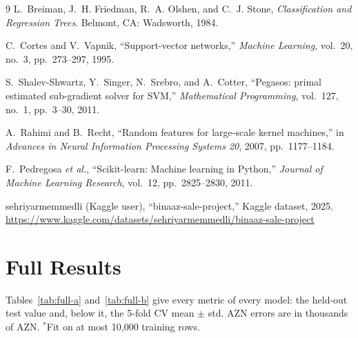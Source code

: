 \documentclass[10pt,twocolumn,a4paper]{article}
\renewcommand{\thesection}{\Roman{section}}
\begin{document}
\begin{thebibliography}{9}
L.~Breiman, J.~H. Friedman, R.~A. Olshen, and C.~J. Stone,
\emph{Classification and Regression Trees}. Belmont, CA: Wadsworth, 1984.

C.~Cortes and V.~Vapnik, ``Support-vector networks,''
\emph{Machine Learning}, vol.~20, no.~3, pp.~273--297, 1995.

S.~Shalev-Shwartz, Y.~Singer, N.~Srebro, and A.~Cotter,
``Pegasos: primal estimated sub-gradient solver for SVM,''
\emph{Mathematical Programming}, vol.~127, no.~1, pp.~3--30, 2011.

A.~Rahimi and B.~Recht, ``Random features for large-scale kernel
machines,'' in \emph{Advances in Neural Information Processing Systems
20}, 2007, pp.~1177--1184.

F.~Pedregosa \emph{et al.}, ``Scikit-learn: Machine learning in
Python,'' \emph{Journal of Machine Learning Research}, vol.~12,
pp.~2825--2830, 2011.

sehriyarmemmedli (Kaggle user), ``binaaz-sale-project,'' Kaggle dataset,
2025.
\url{https://www.kaggle.com/datasets/sehriyarmemmedli/binaaz-sale-project}
\end{thebibliography}

\onecolumn
\appendix
\renewcommand{\thesection}{\Alph{section}}
\section{Full Results}
\label{sec:appendix}
Tables~\ref{tab:full-a} and~\ref{tab:full-b} give every metric of every
model: the held-out test value and, below it, the 5-fold CV mean $\pm$
std. AZN errors are in thousands of AZN. $^{*}$Fit on at most 10{,}000
training rows.

\begin{table}[h]
  \centering
  \small
  \caption{Task~A (regression of $\log(\text{price})$), all metrics.}
  \label{tab:full-a}
  
\end{table}

\begin{table}[h]
  \centering
  \small
  \caption{Task~B (premium tier), all metrics for the premium class.}
  \label{tab:full-b}
  
\end{table}
\end{document}
